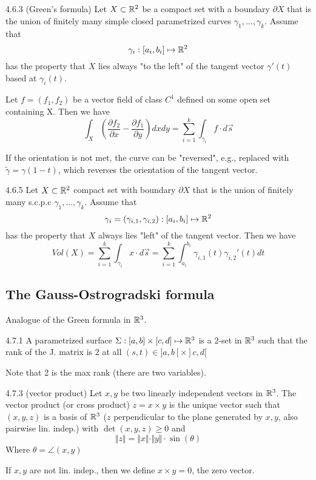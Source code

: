 \begin{theorem}{4.6.3 (Green's formula)}
    Let $X \subset \mathbb{R}^2$ be a compact set with a boundary $\partial X$ that is the union of finitely many simple closed
    parametrized curves $\gamma_1, ..., \gamma_k$. Assume that
    \[ \gamma_i: [a_i, b_i] \mapsto \mathbb{R}^2 \]
    has the property that $X$ lies always "to the left" of the tangent vector $\gamma'(t)$ based at $\gamma_i(t)$.

    Let $f = (f_1, f_2)$ be a vector field of class $C^1$ defined on some open set containing X. Then we have
    \[ \int_X \left( \frac{\partial f_2}{\partial x} - \frac{\partial f_1}{\partial y} \right)dxdy = \sum_{i=1}^k \int_{\gamma_i} f \cdot d\vec{s} \]

    If the orientation is not met, the curve can be "reversed", e.g., replaced with $\tilde \gamma = \gamma(1 - t)$, which
    reverses the orientation of the tangent vector.
\end{theorem}

\begin{corollary}{4.6.5}
    Let $X \subset \mathbb{R}^2$ compact set with boundary $\partial X$ that is the union of finitely many s.c.p.c $\gamma_1, ..., \gamma_k$.
    Assume that 
    \[ \gamma_i = (\gamma_{i,1}, \gamma_{i,2}): [a_i, b_i] \mapsto \mathbb{R}^2 \]
    has the property that $X$ always lies "left" of the tangent vector. Then we have
    \[ Vol(X) = \sum_{i=1}^k \int_{\gamma_i} x \cdot d \vec{s} = \sum_{i=1}^k \int_{a_i}^{b_i} \gamma_{i,1}(t) \gamma_{i,2}'(t)dt \]
\end{corollary}

\subsection{The Gauss-Ostrogradski formula}

Analogue of the Green formula in $\mathbb{R}^3$.

\begin{definition}{4.7.1}
    A parametrized surface $\Sigma: [a,b] \times [c,d] \mapsto \mathbb{R}^3$ is a 2-set in $\mathbb{R}^3$ such that the rank
    of the J. matrix is $2$ at all $(s,t) \in ]a,b[ \times ]c,d[$

    Note that 2 is the max rank (there are two variables).
\end{definition}

\begin{definition}{4.7.3 (vector product)}
    Let $x,y$ be two linearly independent vectors in $\mathbb{R}^3$.
    The vector product (or cross product) $z = x \times y$ is the unique vector such that $(x,y,z)$ is a basis of $\mathbb{R}^3$ ($z$ perpendicular
    to the plane generated by $x,y$, also pairwise lin. indep.) with $\det(x,y,z) \ge 0$ and
    \[ \Vert z \Vert = \Vert x \Vert \cdot \Vert y \Vert \cdot \sin(\theta) \]
    Where $\theta = \angle(x,y)$

    If $x,y$ are not lin. indep., then we define $x \times y = 0$, the zero vector.
\end{definition}

